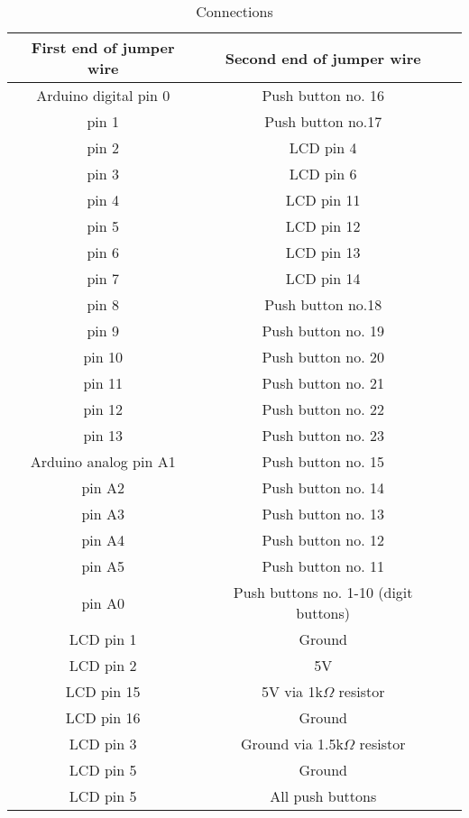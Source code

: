 \begin{table}[H]
\centering
\caption{Connections}
\label{tab:connections}
\begin{tabular}{ccc}
\toprule
First end of jumper wire & Second end of jumper wire \\
\midrule
Arduino digital pin 0 & Push button no. 16 \\
pin 1 & Push button no.17 \\
pin 2 & LCD pin 4 \\
pin 3 & LCD pin 6 \\
pin 4 & LCD pin 11 \\
pin 5 & LCD pin 12 \\
pin 6 & LCD pin 13 \\
pin 7 & LCD pin 14 \\
pin 8 & Push button no.18 \\
pin 9 & Push button no. 19 \\
pin 10 & Push button no. 20 \\
pin 11 & Push button no. 21 \\
pin 12 & Push button no. 22 \\
pin 13 & Push button no. 23 \\
Arduino analog pin A1 & Push button no. 15 \\
pin A2 & Push button no. 14 \\
pin A3 & Push button no. 13 \\
pin A4 & Push button no. 12 \\
pin A5 & Push button no. 11 \\
pin A0 & Push buttons no. 1-10 (digit buttons) \\
LCD pin 1 & Ground \\
LCD pin 2 & 5V \\
LCD pin 15 & 5V via 1k$\Omega$ resistor \\
LCD pin 16 & Ground \\
LCD pin 3 & Ground via 1.5k$\Omega$ resistor \\
LCD pin 5 & Ground \\
LCD pin 5 & All push buttons \\
\bottomrule
\end{tabular}
\end{table}
